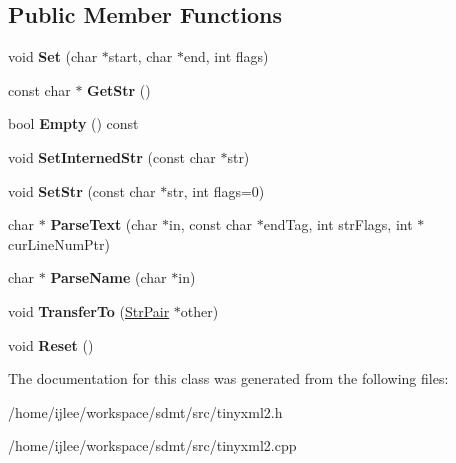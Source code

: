 \subsection*{Public Member Functions}
\begin{DoxyCompactItemize}
\item 
\mbox{\label{classtinyxml2_1_1_str_pair_a4f05549373394266a1eecba26813c166}} 
void {\bfseries Set} (char $\ast$start, char $\ast$end, int flags)
\item 
\mbox{\label{classtinyxml2_1_1_str_pair_ad87e3d11330f5e689ba1e7e54c023b57}} 
const char $\ast$ {\bfseries Get\+Str} ()
\item 
\mbox{\label{classtinyxml2_1_1_str_pair_aca963a7eaa900bfddbea7312f040b39c}} 
bool {\bfseries Empty} () const
\item 
\mbox{\label{classtinyxml2_1_1_str_pair_a2baf6230e18333e02ab65d0897ee3941}} 
void {\bfseries Set\+Interned\+Str} (const char $\ast$str)
\item 
\mbox{\label{classtinyxml2_1_1_str_pair_a1f82ec6b5bee35ee7466d8565e43b1de}} 
void {\bfseries Set\+Str} (const char $\ast$str, int flags=0)
\item 
\mbox{\label{classtinyxml2_1_1_str_pair_a68e6999b7677fa711287ececb9ba317e}} 
char $\ast$ {\bfseries Parse\+Text} (char $\ast$in, const char $\ast$end\+Tag, int str\+Flags, int $\ast$cur\+Line\+Num\+Ptr)
\item 
\mbox{\label{classtinyxml2_1_1_str_pair_aa6d8998efceba41d87ec2300c70a6085}} 
char $\ast$ {\bfseries Parse\+Name} (char $\ast$in)
\item 
\mbox{\label{classtinyxml2_1_1_str_pair_a35f795b1557fe5fdcbd93d3cc5d6b939}} 
void {\bfseries Transfer\+To} (\hyperlink{classtinyxml2_1_1_str_pair}{Str\+Pair} $\ast$other)
\item 
\mbox{\label{classtinyxml2_1_1_str_pair_a80c1b3bd99bf62ae85c94a29ce537125}} 
void {\bfseries Reset} ()
\end{DoxyCompactItemize}


The documentation for this class was generated from the following files\+:\begin{DoxyCompactItemize}
\item 
/home/ijlee/workspace/sdmt/src/tinyxml2.\+h\item 
/home/ijlee/workspace/sdmt/src/tinyxml2.\+cpp\end{DoxyCompactItemize}

